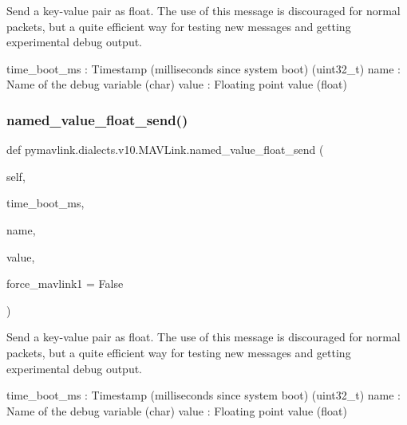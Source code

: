 \begin{DoxyVerb}
\begin{DoxyVerb}
\begin{DoxyVerb}
\begin{DoxyVerb}
\begin{DoxyVerb}Send a key-value pair as float. The use of this message is discouraged
for normal packets, but a quite efficient way for
testing new messages and getting experimental debug
output.

time_boot_ms              : Timestamp (milliseconds since system boot) (uint32_t)
name                      : Name of the debug variable (char)
value                     : Floating point value (float)\end{DoxyVerb}
 \mbox{\label{classpymavlink_1_1dialects_1_1v10_1_1MAVLink_a58f80d13fb96a139cf1ae61f655efac5}} 
\subsubsection{\texorpdfstring{named\+\_\+value\+\_\+float\+\_\+send()}{named\_value\_float\_send()}}
{\footnotesize\ttfamily def pymavlink.\+dialects.\+v10.\+M\+A\+V\+Link.\+named\+\_\+value\+\_\+float\+\_\+send (\begin{DoxyParamCaption}\item[{}]{self,  }\item[{}]{time\+\_\+boot\+\_\+ms,  }\item[{}]{name,  }\item[{}]{value,  }\item[{}]{force\+\_\+mavlink1 = {\ttfamily False} }\end{DoxyParamCaption})}

\begin{DoxyVerb}Send a key-value pair as float. The use of this message is discouraged
for normal packets, but a quite efficient way for
testing new messages and getting experimental debug
output.

time_boot_ms              : Timestamp (milliseconds since system boot) (uint32_t)
name                      : Name of the debug variable (char)
value                     : Floating point value (float)\end{DoxyVerb}
 \mbox{\label{classpymavlink_1_1dialects_1_1v10_1_1MAVLink_aae5cba83e43546b602f6afece1f5f054}} 

\end{DoxyVerb}
\end{DoxyVerb}
\end{DoxyVerb}
\end{DoxyVerb}
